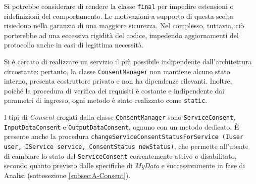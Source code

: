 Si potrebbe considerare di rendere la classe \texttt{final} per impedire estensioni o ridefinizioni del comportamento. Le motivazioni a supporto di questa scelta risiedono nella garanzia di una maggiore sicurezza. Nel complesso, tuttavia, ci\`o porterebbe ad una eccessiva rigidit\`a del codice, impedendo aggiornamenti del protocollo anche in casi di legittima necessit\`a.

Si \`e cercato di realizzare un servizio il pi\`u possibile indipendente dall'architettura circostante: pertanto, la classe \texttt{ConsentManager} non mantiene alcuno stato interno, presenta costruttore privato e non ha dipendenze rilevanti. Inoltre, poich\'e la procedura di verifica dei requisiti \`e costante e indipendente dai parametri di ingresso, ogni metodo \`e stato realizzato come \texttt{static}. 

I tipi di \textit{Consent} erogati dalla classe \texttt{ConsentManager} sono \texttt{ServiceConsent}, \texttt{InputDataConsent} e \texttt{OutputDataConsent}, ognuno con un metodo dedicato. \`E presente anche la procedura \texttt{changeServiceConsentStatusForService (IUser user, IService service, ConsentStatus newStatus)}, che permette all’utente di cambiare lo stato del \texttt{ServiceConsent} correntemente attivo o disabilitato, secondo quanto previsto dalle specifiche di \textit{MyData} e successivamente in fase di Analisi (sottosezione \ref{subsec:A-Consent}).

